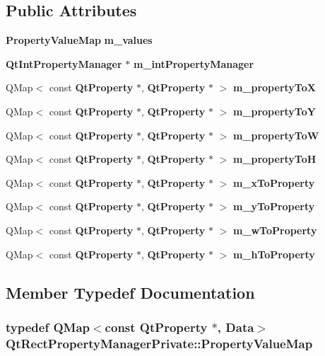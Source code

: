 \subsection*{Public Attributes}
\begin{DoxyCompactItemize}
\item 
{\bf Property\+Value\+Map} {\bf m\+\_\+values}
\item 
{\bf Qt\+Int\+Property\+Manager} $\ast$ {\bf m\+\_\+int\+Property\+Manager}
\item 
Q\+Map$<$ const {\bf Qt\+Property} $\ast$, {\bf Qt\+Property} $\ast$ $>$ {\bf m\+\_\+property\+ToX}
\item 
Q\+Map$<$ const {\bf Qt\+Property} $\ast$, {\bf Qt\+Property} $\ast$ $>$ {\bf m\+\_\+property\+ToY}
\item 
Q\+Map$<$ const {\bf Qt\+Property} $\ast$, {\bf Qt\+Property} $\ast$ $>$ {\bf m\+\_\+property\+ToW}
\item 
Q\+Map$<$ const {\bf Qt\+Property} $\ast$, {\bf Qt\+Property} $\ast$ $>$ {\bf m\+\_\+property\+ToH}
\item 
Q\+Map$<$ const {\bf Qt\+Property} $\ast$, {\bf Qt\+Property} $\ast$ $>$ {\bf m\+\_\+x\+To\+Property}
\item 
Q\+Map$<$ const {\bf Qt\+Property} $\ast$, {\bf Qt\+Property} $\ast$ $>$ {\bf m\+\_\+y\+To\+Property}
\item 
Q\+Map$<$ const {\bf Qt\+Property} $\ast$, {\bf Qt\+Property} $\ast$ $>$ {\bf m\+\_\+w\+To\+Property}
\item 
Q\+Map$<$ const {\bf Qt\+Property} $\ast$, {\bf Qt\+Property} $\ast$ $>$ {\bf m\+\_\+h\+To\+Property}
\end{DoxyCompactItemize}


\subsection{Member Typedef Documentation}
\subsubsection[{Property\+Value\+Map}]{\setlength{\rightskip}{0pt plus 5cm}typedef Q\+Map$<$const {\bf Qt\+Property} $\ast$, {\bf Data}$>$ {\bf Qt\+Rect\+Property\+Manager\+Private\+::\+Property\+Value\+Map}}\label{classQtRectPropertyManagerPrivate_afa193e1480c63f286c1e14b3f1b9b12c}


